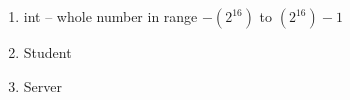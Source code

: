 \begin{enumerate}
	\item int -- whole number in range $-(2^{16})$ to $(2^{16})-1$
	\item Student
	\item Server
\end{enumerate}

